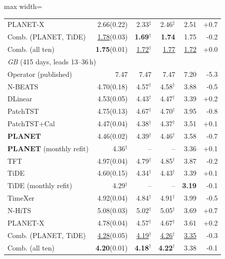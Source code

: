 \begin{table}[!t]
\begin{adjustbox}{max width=\linewidth}
\begin{tabular}{lrrrrr}
\quad PLANET-X & 2.66{\scriptsize\color{gray}(0.22)} & 2.33$^{\ddagger}$ & 2.46$^{\ddagger}$ & 2.51 & +0.7 \\
\quad Comb. (PLANET, TiDE) & \underline{1.78}{\scriptsize\color{gray}(0.03)} & \textbf{1.69}$^{\dagger}$ & \textbf{1.74} & 1.75 & -0.2 \\
\quad Comb. (all ten) & \textbf{1.75}{\scriptsize\color{gray}(0.01)} & \underline{1.72}$^{\dagger}$ & \underline{1.77} & \underline{1.72} & +0.0 \\
\midrule
\multicolumn{6}{l}{\textit{GB} (415 days, leads 13--36\,h)} \\
\quad Operator (published) & 7.47 & 7.47 & 7.47 & 7.20 & -5.3 \\
\quad N-BEATS & 4.70{\scriptsize\color{gray}(0.18)} & 4.57$^{\dagger}$ & 4.58$^{\dagger}$ & 3.88 & -0.5 \\
\quad DLinear & 4.53{\scriptsize\color{gray}(0.05)} & 4.43$^{\dagger}$ & 4.47$^{\dagger}$ & 3.39 & +0.2 \\
\quad PatchTST & 4.75{\scriptsize\color{gray}(0.13)} & 4.67$^{\dagger}$ & 4.70$^{\dagger}$ & 3.95 & -0.8 \\
\quad PatchTST+Cal & 4.47{\scriptsize\color{gray}(0.04)} & 4.38$^{\dagger}$ & 4.37$^{\dagger}$ & 3.51 & +0.1 \\
\quad \textbf{PLANET} & 4.46{\scriptsize\color{gray}(0.02)} & 4.39$^{\dagger}$ & 4.46$^{\dagger}$ & 3.58 & -0.7 \\
\quad \textbf{PLANET} (monthly refit) & 4.36$^{\dagger}$ & -- & -- & 3.36 & +0.1 \\
\quad TFT & 4.97{\scriptsize\color{gray}(0.04)} & 4.79$^{\dagger}$ & 4.85$^{\dagger}$ & 3.87 & -0.2 \\
\quad TiDE & 4.60{\scriptsize\color{gray}(0.15)} & 4.34$^{\dagger}$ & 4.43$^{\dagger}$ & 3.39 & +0.1 \\
\quad TiDE (monthly refit) & 4.29$^{\dagger}$ & -- & -- & \textbf{3.19} & -0.1 \\
\quad TimeXer & 4.92{\scriptsize\color{gray}(0.04)} & 4.84$^{\dagger}$ & 4.91$^{\dagger}$ & 3.99 & -0.5 \\
\quad N-HiTS & 5.08{\scriptsize\color{gray}(0.03)} & 5.02$^{\dagger}$ & 5.05$^{\dagger}$ & 3.69 & +0.7 \\
\quad PLANET-X & 4.78{\scriptsize\color{gray}(0.04)} & 4.57$^{\dagger}$ & 4.67$^{\dagger}$ & 3.61 & +0.2 \\
\quad Comb. (PLANET, TiDE) & \underline{4.28}{\scriptsize\color{gray}(0.05)} & \underline{4.19}$^{\dagger}$ & \underline{4.26}$^{\dagger}$ & \underline{3.35} & -0.3 \\
\quad Comb. (all ten) & \textbf{4.20}{\scriptsize\color{gray}(0.01)} & \textbf{4.18}$^{\dagger}$ & \textbf{4.22}$^{\dagger}$ & 3.38 & -0.1 \\
\bottomrule
\end{tabular}
\end{adjustbox}
\end{table}
